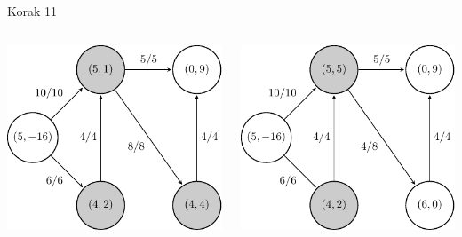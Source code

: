 \documentclass{beamer}
\begin{document}
\begin{frame}{Korak 11}
    \begin{columns}
        \begin{column}{0.5\textwidth}
            \centering
            \includegraphics[scale=0.7]{../writing/images/graf2-12.pdf}
        \end{column}
        \pause
        \begin{column}{0.5\textwidth}
            \centering
            \includegraphics[scale=0.7]{../writing/images/graf2-13.pdf}
        \end{column}
    \end{columns}
\end{frame}
\end{document}
